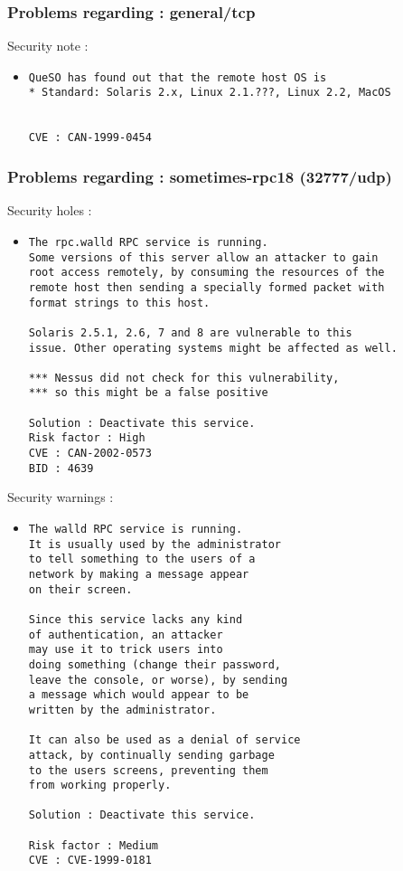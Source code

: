 \documentclass{article}
\begin{document}
\subsubsection{Problems regarding : general/tcp}
Security note :\\
\begin{itemize}
\item \begin{verbatim}
QueSO has found out that the remote host OS is 
* Standard: Solaris 2.x, Linux 2.1.???, Linux 2.2, MacOS


CVE : CAN-1999-0454
\end{verbatim}\end{itemize}
\subsubsection{Problems regarding : sometimes-rpc18 (32777/udp)}
Security holes :\\
\begin{itemize}
\item \begin{verbatim}
The rpc.walld RPC service is running. 
Some versions of this server allow an attacker to gain
root access remotely, by consuming the resources of the 
remote host then sending a specially formed packet with
format strings to this host.

Solaris 2.5.1, 2.6, 7 and 8 are vulnerable to this
issue. Other operating systems might be affected as well.

*** Nessus did not check for this vulnerability, 
*** so this might be a false positive

Solution : Deactivate this service.
Risk factor : High
CVE : CAN-2002-0573
BID : 4639
\end{verbatim}\end{itemize}
Security warnings :\\
\begin{itemize}
\item \begin{verbatim}
The walld RPC service is running. 
It is usually used by the administrator
to tell something to the users of a
network by making a message appear
on their screen.

Since this service lacks any kind
of authentication, an attacker
may use it to trick users into
doing something (change their password,
leave the console, or worse), by sending
a message which would appear to be
written by the administrator.

It can also be used as a denial of service
attack, by continually sending garbage
to the users screens, preventing them
from working properly.

Solution : Deactivate this service.

Risk factor : Medium
CVE : CVE-1999-0181
\end{verbatim}\end{itemize}
\end{document}
